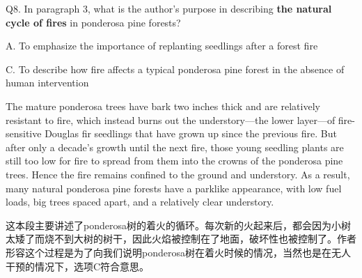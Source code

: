 \begin{blk}
    \begin{qst}
        Q8. In paragraph 3, what is the author’s purpose in describing \textbf{the natural cycle of fires} in ponderosa pine forests?
    \end{qst}

    \begin{chc}
        A. To emphasize the importance of replanting seedlings after a forest fire

        C. To describe how fire affects a typical ponderosa pine forest in the absence of human intervention
    \end{chc}

    \begin{psgq}
        The mature ponderosa trees have bark two inches thick and are relatively resistant to fire, which instead burns out the understory—the lower layer—of fire-sensitive Douglas fir seedlings that have grown up since the previous fire. But after only a decade’s growth until the next fire, those young seedling plants are still too low for fire to spread from them into the crowns of the ponderosa pine trees. Hence the fire remains confined to the ground and understory. As a result, many natural ponderosa pine forests have a parklike appearance, with low fuel loads, big trees spaced apart, and a relatively clear understory.
    \end{psgq}

    \begin{nlz}
        这本段主要讲述了ponderosa树的着火的循环。每次新的火起来后，都会因为小树太矮了而烧不到大树的树干，因此火焰被控制在了地面，破坏性也被控制了。作者形容这个过程是为了向我们说明ponderosa树在着火时候的情况，当然也是在无人干预的情况下，选项C符合意思。
    \end{nlz}
\end{blk}

\newpage
